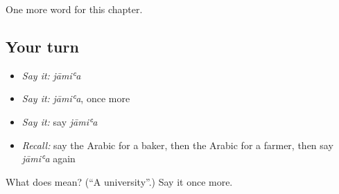 \begin{grammarlens}[title={What you've built}]
One more word for this chapter.
\end{grammarlens}

\subsection*{Your turn}
\begin{itemize}
\raggedright
  \item \emph{Say it:} \emph{jāmiʿa}
  \item \emph{Say it:} \emph{jāmiʿa}, once more
  \item \emph{Say it:} say \emph{jāmiʿa}
  \item \emph{Recall:} say the Arabic for a baker, then the Arabic for a farmer, then say \emph{jāmiʿa} again
\end{itemize}

\begin{tcolorbox}[breakable,colback=teal!4,colframe=teal!35!black,title={Before you move on}]
What does  mean? (\textquotedblleft{}A university\textquotedblright{}.) Say it once more.
\end{tcolorbox}
